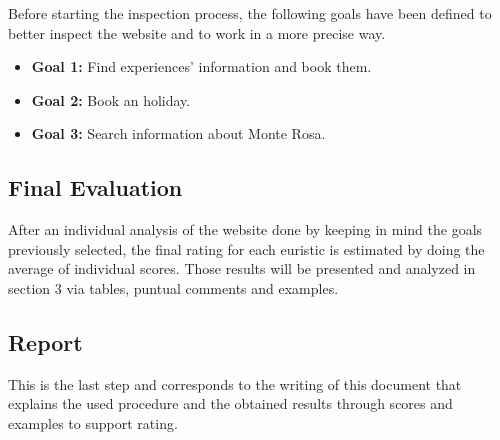 Before starting the inspection process, the following goals have been defined to better inspect the website and to work in a more precise way.
\begin{itemize}
	\item \textbf{Goal 1:} Find experiences' information and book them.
	\item \textbf{Goal 2:} Book an holiday.
	\item \textbf{Goal 3:} Search information about Monte Rosa.

\end{itemize}


\subsection{Final Evaluation}
After an individual analysis of the website done by keeping in mind the goals previously selected, the final rating for each euristic is estimated by doing the average of individual scores. Those results will be presented and  analyzed in section 3 via tables, puntual comments and examples.


\subsection{Report}
This is the last step and corresponds to the writing of this document that explains the used procedure and the obtained results through scores and examples to support rating.
